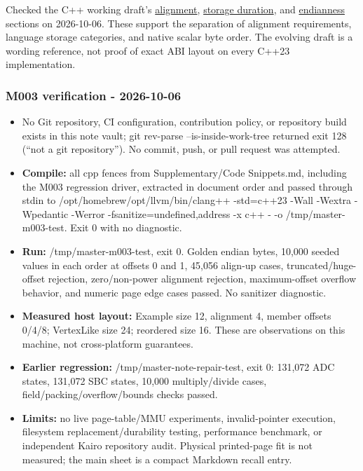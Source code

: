 Checked the C++ working draft's \href{https://eel.is/c++draft/basic.align}{alignment}, \href{https://eel.is/c++draft/basic.stc}{storage duration}, and \href{https://eel.is/c++draft/bit.endian}{endianness} sections on 2026-10-06. These support the separation of alignment requirements, language storage categories, and native scalar byte order. The evolving draft is a wording reference, not proof of exact ABI layout on every C++23 implementation.

\subsubsection{M003 verification - 2026-10-06}\label{appendix-a103e7846d21-m003-verification---2026-10-06}

\begin{itemize}
\tightlist
\item
  No Git repository, CI configuration, contribution policy, or repository build exists in this note vault; git rev-parse --is-inside-work-tree returned exit 128 (``not a git repository''). No commit, push, or pull request was attempted.
\item
  \textbf{Compile:} all cpp fences from Supplementary/Code Snippets.md, including the M003 regression driver, extracted in document order and passed through stdin to /opt/homebrew/opt/llvm/bin/clang++ -std=c++23 -Wall -Wextra -Wpedantic -Werror -fsanitize=undefined,address -x c++ - -o /tmp/master-m003-test. Exit 0 with no diagnostic.
\item
  \textbf{Run:} /tmp/master-m003-test, exit 0. Golden endian bytes, 10,000 seeded values in each order at offsets 0 and 1, 45,056 align-up cases, truncated/huge-offset rejection, zero/non-power alignment rejection, maximum-offset overflow behavior, and numeric page edge cases passed. No sanitizer diagnostic.
\item
  \textbf{Measured host layout:} Example size 12, alignment 4, member offsets 0/4/8; VertexLike size 24; reordered size 16. These are observations on this machine, not cross-platform guarantees.
\item
  \textbf{Earlier regression:} /tmp/master-note-repair-test, exit 0: 131,072 ADC states, 131,072 SBC states, 10,000 multiply/divide cases, field/packing/overflow/bounds checks passed.
\item
  \textbf{Limits:} no live page-table/MMU experiments, invalid-pointer execution, filesystem replacement/durability testing, performance benchmark, or independent Kairo repository audit. Physical printed-page fit is not measured; the main sheet is a compact Markdown recall entry.

\end{itemize}
